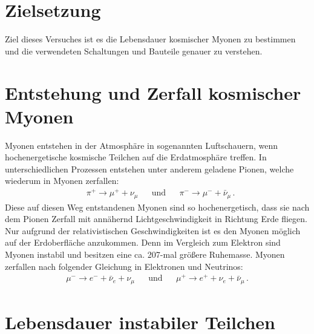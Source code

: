 \section{Zielsetzung}
    Ziel dieses Versuches ist es die Lebensdauer kosmischer Myonen zu bestimmen und die verwendeten Schaltungen und Bauteile genauer zu verstehen.

    \section{Entstehung und Zerfall kosmischer Myonen}
        Myonen entstehen in der Atmosphäre in sogenannten Luftschauern, wenn hochenergetische kosmische Teilchen auf die Erdatmosphäre treffen.
        In unterschiedlichen Prozessen entstehen unter anderem geladene Pionen, welche wiederum in Myonen zerfallen:
        \begin{align}
            &\pi^+ \rightarrow \mu^+ + \nu_\mu && \text{und} && \pi^- \rightarrow \mu^- + \bar{\nu}_\mu \, .
        \end{align}
        Diese auf diesen Weg entstandenen Myonen sind so hochenergetisch, 
        dass sie nach dem Pionen Zerfall mit annähernd Lichtgeschwindigkeit in Richtung Erde fliegen.
        Nur aufgrund der relativistischen Geschwindigkeiten ist es den Myonen möglich auf der Erdoberfläche anzukommen. 
        Denn im Vergleich zum Elektron sind Myonen instabil und besitzen eine ca. 207-mal größere Ruhemasse. 
        Myonen zerfallen nach folgender Gleichung in Elektronen und Neutrinos:
        \begin{align}
            \mu^- \rightarrow e^- + \bar{\nu}_e + \nu_\mu && \text{und} &&  \mu^+ \rightarrow e^+ + \nu_e + \bar{\nu}_\mu \, . 
        \end{align} 

    \section{Lebensdauer instabiler Teilchen}

